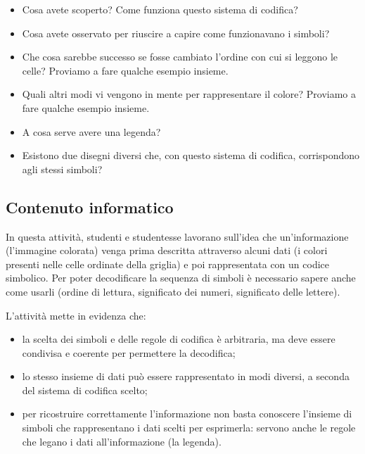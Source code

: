 \begin{domandestimolo}\label{domande-stimolo-8}

\begin{itemize}
\item
  Cosa avete scoperto? Come funziona questo sistema di codifica?
\item
  Cosa avete osservato per riuscire a capire come funzionavano i simboli?
\item
  Che cosa sarebbe successo se fosse cambiato l'ordine con cui si leggono le celle? Proviamo a fare qualche esempio insieme.
\item
  Quali altri modi vi vengono in mente per rappresentare il colore? Proviamo a fare qualche esempio insieme.
\item
  A cosa serve avere una legenda?
\item
  Esistono due disegni diversi che, con questo sistema di codifica, corrispondono agli stessi simboli?
\end{itemize}
\end{domandestimolo}

\subsection{Contenuto informatico }\label{contenuto-informatico-6}

In questa attività, studenti e studentesse lavorano sull'idea che un'informazione (l'immagine colorata) venga prima descritta attraverso alcuni dati (i colori presenti nelle celle ordinate della griglia) e poi rappresentata con un codice simbolico. Per poter decodificare la sequenza di simboli è necessario sapere anche come usarli (ordine di lettura, significato dei numeri, significato delle lettere).

L'attività mette in evidenza che:

\begin{itemize}
\item
  la scelta dei simboli e delle regole di codifica è arbitraria, ma deve essere condivisa e coerente per permettere la decodifica;
\item
  lo stesso insieme di dati può essere rappresentato in modi diversi, a seconda del sistema di codifica scelto;
\item
  per ricostruire correttamente l'informazione non basta conoscere l'insieme di simboli che rappresentano i dati scelti per esprimerla: servono anche le regole che legano i dati all'informazione (la legenda).
\end{itemize}

